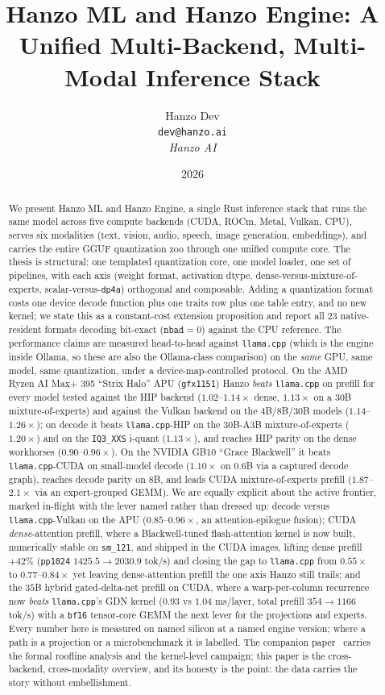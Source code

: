 \documentclass[11pt]{article}
\title{Hanzo ML and Hanzo Engine: A Unified Multi-Backend, Multi-Modal Inference Stack}
\author{Hanzo Dev \\ \texttt{dev@hanzo.ai} \\ \textit{Hanzo AI}}
\date{2026}
\begin{document}
\hanzocoverpage

\begin{abstract}
We present Hanzo ML and Hanzo Engine, a single Rust inference stack that runs the same model
across five compute backends (CUDA, ROCm, Metal, Vulkan, CPU), serves six modalities (text,
vision, audio, speech, image generation, embeddings), and carries the entire GGUF quantization
zoo through one unified compute core. The thesis is structural: one templated quantization core,
one model loader, one set of pipelines, with each axis (weight format, activation dtype,
dense-versus-mixture-of-experts, scalar-versus-\texttt{dp4a}) orthogonal and composable. Adding a
quantization format costs one device decode function plus one traits row plus one table entry, and
no new kernel; we state this as a constant-cost extension proposition and report all $23$
native-resident formats decoding bit-exact ($\texttt{nbad}=0$) against the CPU reference. The
performance claims are measured head-to-head against \texttt{llama.cpp} (which is the engine inside
Ollama, so these are also the Ollama-class comparison) on the \emph{same} GPU, same model, same
quantization, under a device-map-controlled protocol. On the AMD Ryzen AI Max+ 395 ``Strix Halo''
APU (\texttt{gfx1151}) Hanzo \emph{beats} \texttt{llama.cpp} on prefill for every model tested
against the HIP backend ($1.02$--$1.14\times$ dense, $1.13\times$ on a $30$B mixture-of-experts)
and against the Vulkan backend on the $4$B/$8$B/$30$B models ($1.14$--$1.26\times$); on decode it
beats \texttt{llama.cpp}-HIP on the $30$B-A3B mixture-of-experts ($1.20\times$) and on the
\texttt{IQ3\_XXS} i-quant ($1.13\times$), and reaches HIP parity on the dense workhorses
($0.90$--$0.96\times$). On the NVIDIA GB10 ``Grace Blackwell'' it beats \texttt{llama.cpp}-CUDA on
small-model decode ($1.10\times$ on $0.6$B via a captured decode graph), reaches decode parity
on $8$B, and leads CUDA mixture-of-experts prefill ($1.87$--$2.1\times$ via an expert-grouped GEMM).
We are equally explicit about the active frontier, marked in-flight with the lever named
rather than dressed up: decode versus \texttt{llama.cpp}-Vulkan on the APU ($0.85$--$0.96\times$,
an attention-epilogue fusion); CUDA \emph{dense}-attention prefill, where a Blackwell-tuned
flash-attention kernel is now built, numerically stable on \texttt{sm\_121}, and shipped in the CUDA
images, lifting dense prefill $+42\%$ (\texttt{pp1024} $1425.5 \to 2030.9$ tok/s) and closing the gap
to \texttt{llama.cpp} from $0.55\times$ to $0.77$--$0.84\times$ yet leaving dense-attention prefill the
one axis Hanzo still trails; and the $35$B hybrid gated-delta-net prefill on CUDA, where a
warp-per-column recurrence now \emph{beats} \texttt{llama.cpp}'s GDN kernel ($0.93$ vs $1.04$
ms/layer, total prefill $354 \to 1166$ tok/s) with a \texttt{bf16} tensor-core GEMM the next lever for
the projections and experts. Every number here is measured on named silicon at a named engine version; where a path
is a projection or a microbenchmark it is labelled. The companion paper~\cite{hanzorocm} carries
the formal roofline analysis and the kernel-level campaign; this paper is the cross-backend,
cross-modality overview, and its honesty is the point: the data carries the story without
embellishment.
\end{abstract}
\end{document}
